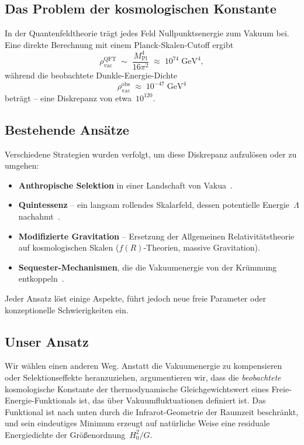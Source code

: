 \documentclass[12pt,a4paper]{article}
\theoremstyle{definition}
\theoremstyle{plain}
\theoremstyle{remark}
\newcommand{\rhov}{\rho_{\mathrm{vac}}}
\begin{document}
\subsection{Das Problem der kosmologischen Konstante}

In der Quantenfeldtheorie tr\"agt jedes Feld Nullpunktsenergie zum Vakuum
bei. Eine direkte Berechnung mit einem Planck-Skalen-Cutoff
ergibt~\cite{Weinberg1989,Zeldovich1968}
\begin{equation}\label{eq:qft-estimate}
  \rhov^{\mathrm{QFT}} \;\sim\; \frac{M_{\mathrm{Pl}}^{4}}{16\pi^{2}}
  \;\approx\; 10^{74}\;\mathrm{GeV}^{4},
\end{equation}
w\"ahrend die beobachtete Dunkle-Energie-Dichte
\begin{equation}\label{eq:obs}
  \rhov^{\mathrm{obs}} \;\approx\; 10^{-47}\;\mathrm{GeV}^{4}
\end{equation}
betr\"agt -- eine Diskrepanz von etwa~$10^{120}$.

\subsection{Bestehende Ans\"atze}

Verschiedene Strategien wurden verfolgt, um diese Diskrepanz aufzul\"osen
oder zu umgehen:
\begin{itemize}
  \item \textbf{Anthropische Selektion} in einer Landschaft von
        Vakua~\cite{BoussoPolchinski2000,Susskind2003}.
  \item \textbf{Quintessenz} -- ein langsam rollendes Skalarfeld, dessen
        potentielle Energie~$\Lambda$ nachahmt~\cite{PeeblesRatra2003}.
  \item \textbf{Modifizierte Gravitation} -- Ersetzung der Allgemeinen
        Relativit\"atstheorie auf kosmologischen Skalen ($f(R)$-Theorien,
        massive Gravitation).
  \item \textbf{Sequester-Mechanismen}, die die Vakuumenergie von der
        Kr\"ummung entkoppeln~\cite{KaloperPadilla2014}.
\end{itemize}
Jeder Ansatz l\"ost einige Aspekte, f\"uhrt jedoch neue freie Parameter
oder konzeptionelle Schwierigkeiten ein.

\subsection{Unser Ansatz}

Wir w\"ahlen einen anderen Weg. Anstatt die Vakuumenergie zu
kompensieren oder Selektionseffekte heranzuziehen, argumentieren wir,
dass die \emph{beobachtete} kosmologische Konstante der
thermodynamische Gleichgewichtswert eines Freie-Energie-Funktionals
ist, das \"uber Vakuumfluktuationen definiert ist. Das Funktional ist
nach unten durch die Infrarot-Geometrie der Raumzeit beschr\"ankt, und
sein eindeutiges Minimum erzeugt auf nat\"urliche Weise eine residuale
Energiedichte der Gr\"o\ss enordnung~$H_0^{2}/G$.
\end{document}
